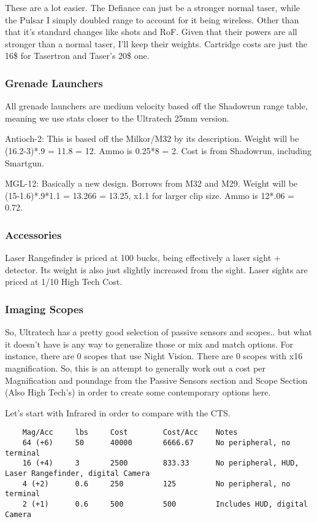 \begin{multicols*}{2}
	These are a lot easier. The Defiance can just be a stronger normal taser, while the Pulsar I simply doubled range to account for it being wireless. Other than that it's standard changes like shots and RoF. Given that their powers are all stronger than a normal taser, I'll keep their weights. Cartridge costs are just the 16\$ for Tasertron and Taser's 20\$ one.
	
	\subsubsection{Grenade Launchers}
	
	All grenade launchers are medium velocity based off the Shadowrun range table, meaning we use stats closer to the Ultratech 25mm version.
	
	Antioch-2: This is based off the Milkor/M32 by its description. Weight will be (16.2-3)*.9 = 11.8 = 12. Ammo is 0.25*8 = 2. Cost is from Shadowrun, including Smartgun.
	
	MGL-12: Basically a new design. Borrows from M32 and M29. Weight will be (15-1.6)*.9*1.1 = 13.266 = 13.25, x1.1 for larger clip size. Ammo is 12*.06 = 0.72.
	
	\subsubsection{Accessories}
	
	Laser Rangefinder is priced at 100 bucks, being effectively a laser sight + detector. Its weight is also just slightly increased from the sight.
	Laser sights are priced at 1/10 High Tech Cost.
	
	
	\subsubsection{Imaging Scopes}
	
	So, Ultratech has a pretty good selection of passive sensors and scopes.. but what it doesn't have is any way to generalize those or mix and match options. For instance, there are 0 scopes that use Night Vision. There are 0 scopes with x16 magnification. So, this is an attempt to generally work out a cost per Magnification and poundage from the Passive Sensors section and Scope Section (Also High Tech's) in order to create some contemporary options here.
	
	Let's start with Infrared in order to compare with the CTS.
	
	\begin{verbatim}
	Mag/Acc		lbs		Cost		Cost/Acc	Notes
	64 (+6)		50		40000		6666.67		No peripheral, no terminal
	16 (+4)		3		2500		833.33		No peripheral, HUD, Laser Rangefinder, digital Camera
	4 (+2)		0.6		250			125			No peripheral, no terminal
	2 (+1)		0.6		500			500			Includes HUD, digital Camera
	\end{verbatim}	
	

\end{multicols*}
